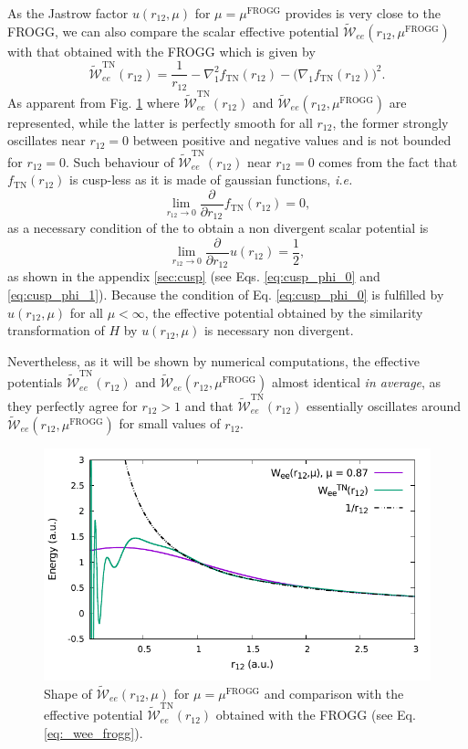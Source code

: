 \documentclass[aip,jcp,reprint,noshowkeys,superscriptaddress]{revtex4-1}
\newcommand{\deriv}[3]{\frac{\partial^{#3} #1}{\partial {#2}^{#3}}}
\newcommand{\mfrogg}[0]{\mu^\text{FROGG}}
\begin{document}
As the Jastrow factor $u(r_{12},\mu)$ for $\mu=\mfrogg$ provides is very close to the FROGG, we can also compare the scalar effective potential $\tilde{\mathcal{W}}_{ee}(r_{12},\mfrogg)$ with that obtained with the FROGG which is given by
\begin{equation}
 \label{eq:_wee_frogg}
 \tilde{\mathcal{W}}_{ee}^\text{TN}(r_{12})= \frac{1}{r_{12}}-\nabla_1^2 f_{\text{TN}}(r_{12}) - \big(\nabla_1 f_{\text{TN}}(r_{12}) \big) ^2. 
\end{equation}
As apparent from Fig. \ref{fig_wee_frogg} where $\tilde{\mathcal{W}}_{ee}^\text{TN}(r_{12})$ and $\tilde{\mathcal{W}}_{ee}(r_{12},\mfrogg)$ are represented, while the latter is perfectly smooth for all $r_{12}$, the former strongly oscillates near $r_{12}=0$ between positive and negative values and is not bounded for $r_{12}=0$. 
Such behaviour of $\tilde{\mathcal{W}}_{ee}^\text{TN}(r_{12})$ near $r_{12}=0$ comes from the fact that $f_{\text{TN}}(r_{12})$ is cusp-less as it is made of gaussian functions, \textit{i.e.} 
\begin{equation}
 \lim_{r_{12}\rightarrow 0} \deriv{}{r_{12}}{}f_{\text{TN}}(r_{12}) = 0, 
\end{equation}
as a necessary condition of the to obtain a non divergent scalar potential is 
\begin{equation}
 \label{eq:cusp_phi_0}
 \lim_{r_{12}\rightarrow 0} \deriv{}{r_{12}}{}u(r_{12}) = \frac{1}{2}, 
\end{equation}
as shown in the appendix \ref{sec:cusp} (see Eqs. \eqref{eq:cusp_phi_0}  and \eqref{eq:cusp_phi_1}). 
Because the condition of Eq. \eqref{eq:cusp_phi_0} is fulfilled by $u(r_{12},\mu)$ for all $\mu < \infty$, 
the effective potential obtained by the similarity transformation of $H$ by $u(r_{12},\mu)$ is necessary non divergent.  

Nevertheless, as it will be shown by numerical computations, the effective potentials $\tilde{\mathcal{W}}_{ee}^\text{TN}(r_{12})$ and $\tilde{\mathcal{W}}_{ee}(r_{12},\mfrogg)$ almost identical \textit{in average}, as they perfectly agree for $r_{12}>1$ and that $\tilde{\mathcal{W}}_{ee}^\text{TN}(r_{12})$ essentially oscillates around $\tilde{\mathcal{W}}_{ee}(r_{12},\mfrogg)$ for small values of $r_{12}$. 

\begin{figure}
 \label{fig_wee_frogg}
        \includegraphics[width=0.45\linewidth]{plots/jastrow/w_ee_frog.pdf}
        \caption{Shape of $\tilde{\mathcal{W}}_{ee}(r_{12},\mu)$ for $\mu=\mfrogg$ and comparison with the effective potential $\tilde{\mathcal{W}}_{ee}^\text{TN}(r_{12})$ obtained with the FROGG (see Eq.\eqref{eq:_wee_frogg}).}
\end{figure}
\end{document}
